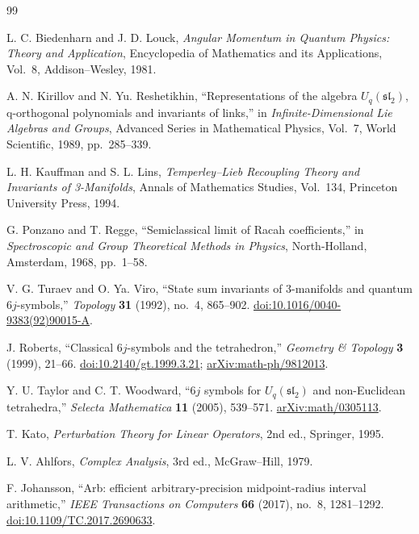 \begin{thebibliography}{99}

L. C. Biedenharn and J. D. Louck,
\emph{Angular Momentum in Quantum Physics: Theory and Application},
Encyclopedia of Mathematics and its Applications, Vol.~8,
Addison--Wesley, 1981.

A. N. Kirillov and N. Yu. Reshetikhin,
``Representations of the algebra $U_q(\mathfrak{sl}_2)$, q-orthogonal polynomials and invariants of links,''
in \emph{Infinite-Dimensional Lie Algebras and Groups},
Advanced Series in Mathematical Physics, Vol.~7,
World Scientific, 1989, pp.~285--339.

L. H. Kauffman and S. L. Lins,
\emph{Temperley--Lieb Recoupling Theory and Invariants of 3-Manifolds},
Annals of Mathematics Studies, Vol.~134,
Princeton University Press, 1994.

G. Ponzano and T. Regge,
``Semiclassical limit of Racah coefficients,''
in \emph{Spectroscopic and Group Theoretical Methods in Physics},
North-Holland, Amsterdam, 1968, pp.~1--58.

V. G. Turaev and O. Ya. Viro,
``State sum invariants of 3-manifolds and quantum $6j$-symbols,''
\emph{Topology} \textbf{31} (1992), no.~4, 865--902.
\href{https://doi.org/10.1016/0040-9383(92)90015-A}{doi:10.1016/0040-9383(92)90015-A}.

J. Roberts,
``Classical $6j$-symbols and the tetrahedron,''
\emph{Geometry \& Topology} \textbf{3} (1999), 21--66.
\href{https://doi.org/10.2140/gt.1999.3.21}{doi:10.2140/gt.1999.3.21};
\href{https://arxiv.org/abs/math-ph/9812013}{arXiv:math-ph/9812013}.

Y. U. Taylor and C. T. Woodward,
``$6j$ symbols for $U_q(\mathfrak{sl}_2)$ and non-Euclidean tetrahedra,''
\emph{Selecta Mathematica} \textbf{11} (2005), 539--571.
\href{https://arxiv.org/abs/math/0305113}{arXiv:math/0305113}.

T. Kato,
\emph{Perturbation Theory for Linear Operators}, 2nd ed.,
Springer, 1995.

L. V. Ahlfors,
\emph{Complex Analysis}, 3rd ed.,
McGraw--Hill, 1979.

F. Johansson,
``Arb: efficient arbitrary-precision midpoint-radius interval arithmetic,''
\emph{IEEE Transactions on Computers} \textbf{66} (2017), no.~8, 1281--1292.
\href{https://doi.org/10.1109/TC.2017.2690633}{doi:10.1109/TC.2017.2690633}.

\end{thebibliography}
